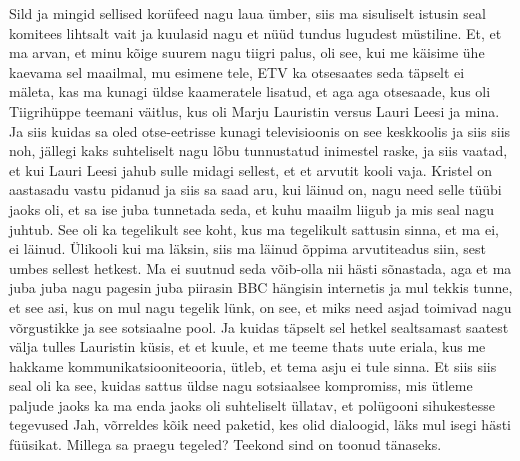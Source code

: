 Sild ja mingid sellised korüfeed nagu laua ümber, siis ma sisuliselt istusin seal komitees lihtsalt vait ja kuulasid nagu et nüüd tundus lugudest müstiline. Et, et ma arvan, et minu kõige suurem nagu tiigri palus, oli see, kui me käisime ühe kaevama sel maailmal, mu esimene tele, ETV ka otsesaates seda täpselt ei mäleta, kas ma kunagi üldse kaameratele lisatud, et aga aga otsesaade, kus oli Tiigrihüppe teemani väitlus, kus oli Marju Lauristin versus Lauri Leesi ja mina. Ja siis kuidas sa oled otse-eetrisse kunagi televisioonis on see keskkoolis ja siis siis noh, jällegi kaks suhteliselt nagu lõbu tunnustatud inimestel raske, ja siis vaatad, et kui Lauri Leesi jahub sulle midagi sellest, et et arvutit kooli vaja. Kristel on aastasadu vastu pidanud ja siis sa saad aru, kui läinud on, nagu need selle tüübi jaoks oli, et sa ise juba tunnetada seda, et kuhu maailm liigub ja mis seal nagu juhtub. See oli ka tegelikult see koht, kus ma tegelikult sattusin sinna, et ma ei, ei läinud.
Ülikooli kui ma läksin, siis ma läinud õppima arvutiteadus siin, sest umbes sellest hetkest. Ma ei suutnud seda võib-olla nii hästi sõnastada, aga et ma juba juba nagu pagesin juba piirasin BBC hängisin internetis ja mul tekkis tunne, et see asi, kus on mul nagu tegelik lünk, on see, et miks need asjad toimivad nagu võrgustikke ja see sotsiaalne pool. Ja kuidas täpselt sel hetkel sealtsamast saatest välja tulles Lauristin küsis, et et kuule, et me teeme thats uute eriala, kus me hakkame kommunikatsiooniteooria, ütleb, et tema asju ei tule sinna. Et siis siis seal oli ka see, kuidas sattus üldse nagu sotsiaalsee kompromiss, mis ütleme paljude jaoks ka ma enda jaoks oli suhteliselt üllatav, et polügooni sihukestesse tegevused
Jah, võrreldes kõik need paketid, kes olid dialoogid, läks mul isegi hästi füüsikat. Millega sa praegu tegeled? Teekond sind on toonud tänaseks.
